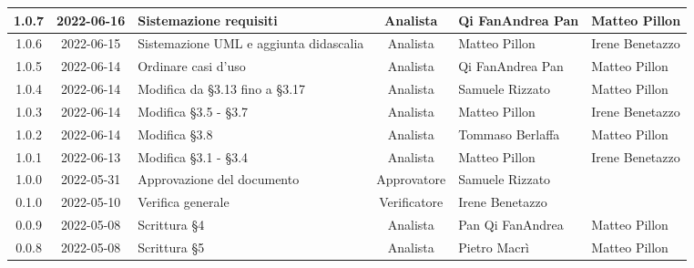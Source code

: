 \begin{center}
\begin{longtable}{ |c|c|p{8em}|c|m{5em}|m{5em}| }
	\hline
	1.0.7 & 2022-06-16 & Sistemazione requisiti & Analista & Qi Fan\newline Andrea Pan & Matteo \newline Pillon\\
	\hline
	1.0.6 & 2022-06-15 & Sistemazione UML \newline e aggiunta didascalia  & Analista & Matteo \newline Pillon & Irene \newline Benetazzo \\
	\hline
	1.0.5 & 2022-06-14 & Ordinare casi d'uso  & Analista & Qi Fan\newline Andrea Pan & Matteo \newline Pillon \\
	\hline
	1.0.4 & 2022-06-14 & Modifica da §3.13 \newline fino a §3.17 & Analista & Samuele	\newline Rizzato & Matteo \newline Pillon\\
	\hline
	1.0.3 & 2022-06-14 & Modifica \newline §3.5 - §3.7 & Analista & Matteo	\newline Pillon & Irene \newline Benetazzo\\
  	\hline
	1.0.2 & 2022-06-14 & Modifica \newline §3.8 & Analista & Tommaso	\newline Berlaffa & Matteo \newline Pillon\\
  	\hline
	1.0.1 & 2022-06-13 & Modifica \newline §3.1 - §3.4 & Analista & Matteo	\newline Pillon & Irene \newline Benetazzo\\
	\hline
	1.0.0 & 2022-05-31 & Approvazione del documento & Approvatore & Samuele \newline Rizzato & \\
	\hline
	0.1.0 & 2022-05-10 & Verifica generale & Verificatore & Irene \newline Benetazzo & \\
	\hline
    0.0.9 & 2022-05-08 & Scrittura §4 & Analista & Pan Qi Fan\newline Andrea & Matteo \newline Pillon\\
	\hline
    0.0.8 & 2022-05-08 & Scrittura §5 & Analista & Pietro \newline Macrì & Matteo \newline Pillon\\

\end{longtable}
\end{center}
